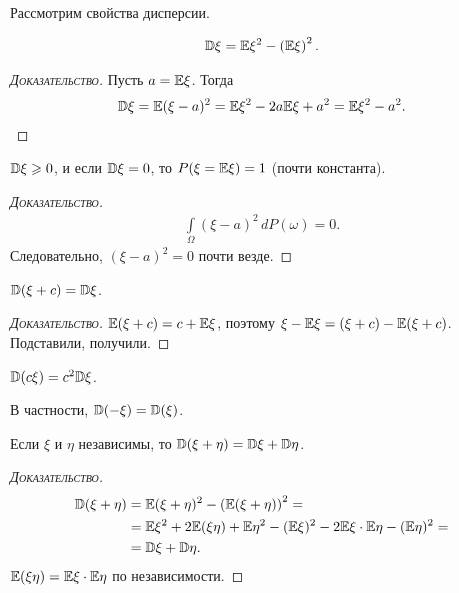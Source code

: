 \documentclass[../main.tex]{subfiles}
\begin{document}
Рассмотрим свойства дисперсии.
\begin{prop}
 \begin{align*}
  \mathbb D\xi = \mathbb E \xi^{2} - \left( \mathbb E \xi \right)^{2}.
 \end{align*} 

\end{prop}
\begin{proof}[\normalfont\textsc{Доказательство}]
 Пусть $a = \mathbb E\xi $. Тогда
 \begin{align*}
  \mathbb D\xi = \mathbb E(\xi - a)^{2} = \mathbb E\xi^{2} - 2a \mathbb E\xi + a^{2} = \mathbb E\xi^{2} - a^{2}.
 \end{align*} 
\end{proof}

\begin{prop}
 $ \mathbb D\xi \geqslant 0 $, и если $ \mathbb D\xi = 0 $, то $ P(\xi = \mathbb E\xi) = 1 $ (почти константа).
\end{prop}
\begin{proof}[\normalfont\textsc{Доказательство}]
 \begin{align*}
  \int\limits_{\Omega} (\xi - a)^{2} \,dP(\omega) = 0.
 \end{align*} Следовательно, $ (\xi - a)^{2} = 0 $ почти везде.
\end{proof}

\begin{prop}
 $ \mathbb D(\xi + c) = \mathbb D\xi $.
\end{prop}
\begin{proof}[\normalfont\textsc{Доказательство}]
 $ \mathbb E(\xi + c) = c + \mathbb E\xi $, поэтому $ \xi - \mathbb E\xi = (\xi + c) - \mathbb E(\xi + c) $. Подставили, получили.
\end{proof}
\begin{prop}
 $ \mathbb D(c\xi) = c^{2}\mathbb D\xi $.

 В частности, $ \mathbb D(-\xi) = \mathbb D(\xi) $.
\end{prop}
\begin{prop}
 Если $ \xi  $ и $ \eta $ независимы, то $ \mathbb D(\xi + \eta) = \mathbb D\xi + \mathbb D\eta $.
\end{prop}
\begin{proof}[\normalfont\textsc{Доказательство}]
 \begin{align*}
  \mathbb D(\xi + \eta) &= \mathbb E(\xi + \eta)^{2} - \left( \mathbb E(\xi+\eta) \right)^{2} = \\
  &= \mathbb E\xi^{2} + 2\mathbb E(\xi\eta) + \mathbb E\eta^{2} -  (\mathbb E\xi)^{2} - 2\mathbb E\xi \cdot \mathbb E\eta - (\mathbb E\eta)^{2} = \\
  &=\mathbb D\xi+\mathbb D\eta.
 \end{align*} $ \mathbb E(\xi\eta) = \mathbb E\xi \cdot \mathbb E\eta $ по независимости.
\end{proof}
\end{document}
